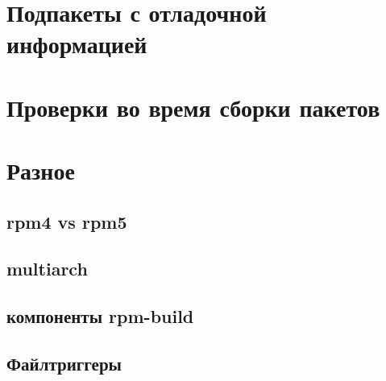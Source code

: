 \documentclass[russian,a4paper,12pt,titlepage]{article}
\begin{document}
\section{Подпакеты с отладочной информацией}

\label{debuginfo-subpackages}

\section{Проверки во время сборки пакетов}

\label{brp-verify}

\section{Разное}

\subsection{rpm4 vs rpm5}

\subsection{multiarch}

\subsection{компоненты rpm-build}

\subsection{Файлтриггеры}
\end{document}
